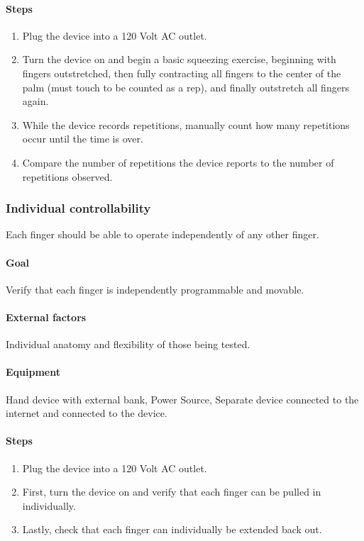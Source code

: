 \documentclass{article}
\begin{document}
\paragraph{Steps}
\begin{enumerate}
\item Plug the device into a 120 Volt AC outlet.
\item Turn the device on and begin a basic squeezing exercise, beginning with fingers outstretched, then fully contracting all fingers to the center of the palm (must touch to be counted as a rep), and finally outstretch all fingers again.
\item While the device records repetitions, manually count how many repetitions occur until the time is over.
\item Compare the number of repetitions the device reports to the number of repetitions observed.
\end{enumerate}

\subsubsection{Individual controllability}
Each finger should be able to operate independently of any other finger.

\paragraph{Goal} Verify that each finger is independently programmable and movable.

\paragraph{External factors} Individual anatomy and flexibility of those being tested.

\paragraph{Equipment} Hand device with external bank, Power Source, Separate device connected to the internet and connected to the device.

\paragraph{Steps}
\begin{enumerate}
\item Plug the device into a 120 Volt AC outlet.
\item First, turn the device on and verify that each finger can be pulled in individually.
\item Lastly, check that each finger can individually be extended back out.
\end{enumerate}
\end{document}
